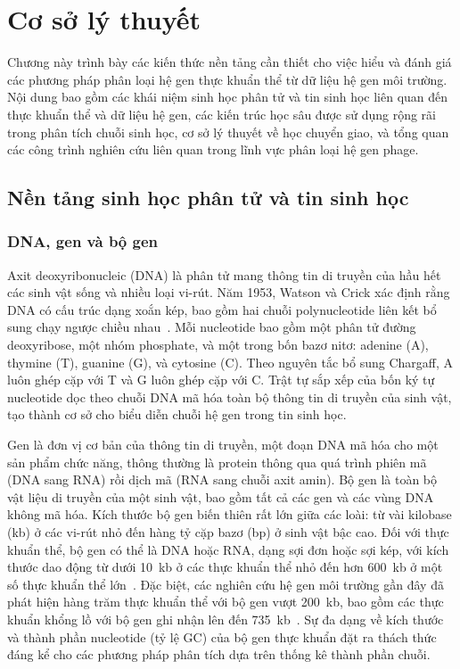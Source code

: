 \chapter{Cơ sở lý thuyết}
\label{chap:theory}

Chương này trình bày các kiến thức nền tảng cần thiết cho việc hiểu và đánh giá các phương pháp phân loại hệ gen thực khuẩn thể từ dữ liệu hệ gen môi trường. Nội dung bao gồm các khái niệm sinh học phân tử và tin sinh học liên quan đến thực khuẩn thể và dữ liệu hệ gen, các kiến trúc học sâu được sử dụng rộng rãi trong phân tích chuỗi sinh học, cơ sở lý thuyết về học chuyển giao, và tổng quan các công trình nghiên cứu liên quan trong lĩnh vực phân loại hệ gen phage.

\section{Nền tảng sinh học phân tử và tin sinh học}
\label{sec:bio_foundation}

\subsection{DNA, gen và bộ gen}
\label{subsec:dna_gene}

Axit deoxyribonucleic (DNA) là phân tử mang thông tin di truyền của hầu hết các sinh vật sống và nhiều loại vi-rút. Năm 1953, Watson và Crick xác định rằng DNA có cấu trúc dạng xoắn kép, bao gồm hai chuỗi polynucleotide liên kết bổ sung chạy ngược chiều nhau~\cite{watson1953molecular}. Mỗi nucleotide bao gồm một phân tử đường deoxyribose, một nhóm phosphate, và một trong bốn bazơ nitơ: adenine (A), thymine (T), guanine (G), và cytosine (C). Theo nguyên tắc bổ sung Chargaff, A luôn ghép cặp với T và G luôn ghép cặp với C. Trật tự sắp xếp của bốn ký tự nucleotide dọc theo chuỗi DNA mã hóa toàn bộ thông tin di truyền của sinh vật, tạo thành cơ sở cho biểu diễn chuỗi hệ gen trong tin sinh học.

Gen là đơn vị cơ bản của thông tin di truyền, một đoạn DNA mã hóa cho một sản phẩm chức năng, thông thường là protein thông qua quá trình phiên mã (DNA sang RNA) rồi dịch mã (RNA sang chuỗi axit amin). Bộ gen là toàn bộ vật liệu di truyền của một sinh vật, bao gồm tất cả các gen và các vùng DNA không mã hóa. Kích thước bộ gen biến thiên rất lớn giữa các loài: từ vài kilobase (kb) ở các vi-rút nhỏ đến hàng tỷ cặp bazơ (bp) ở sinh vật bậc cao. Đối với thực khuẩn thể, bộ gen có thể là DNA hoặc RNA, dạng sợi đơn hoặc sợi kép, với kích thước dao động từ dưới 10~kb ở các thực khuẩn thể nhỏ đến hơn 600~kb ở một số thực khuẩn thể lớn~\cite{brussow2002phage}. Đặc biệt, các nghiên cứu hệ gen môi trường gần đây đã phát hiện hàng trăm thực khuẩn thể với bộ gen vượt 200~kb, bao gồm các thực khuẩn khổng lồ với bộ gen ghi nhận lên đến 735~kb~\cite{al2020huge}. Sự đa dạng về kích thước và thành phần nucleotide (tỷ lệ GC) của bộ gen thực khuẩn đặt ra thách thức đáng kể cho các phương pháp phân tích dựa trên thống kê thành phần chuỗi.

